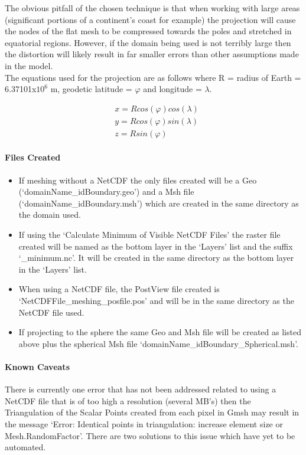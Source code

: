 The obvious pitfall of the chosen technique is that when working with large areas (significant portions of a continent's coast for example) the projection will cause the nodes of the flat mesh to be compressed towards the poles and stretched in equatorial regions. However, if the domain being used is not terribly large then the distortion will likely result in far smaller errors than other assumptions made in the model. \\

The equations used for the projection are as follows where R = radius of Earth = 6.37101x$10^{6}$ m, geodetic latitude = $\varphi$ and longitude = $\lambda$.

\begin{align*}
	&x = Rcos(\varphi)cos(\lambda) \\
	&y = Rcos(\varphi)sin(\lambda) \\
	&z = Rsin(\varphi)
\end{align*}

\paragraph{Files Created}
\begin{itemize}
	\item If meshing without a NetCDF the only files created will be a Geo (`domainName\_idBoundary.geo') and a Msh file (`domainName\_idBoundary.msh') which are created in the same directory as the domain used.
	\item If using the `Calculate Minimum of Visible NetCDF Files' the raster file created will be named as the bottom layer in the `Layers' list and the suffix `\_minimum.nc'. It will be created in the same directory as the bottom layer in the `Layers' list.
	\item When using a NetCDF file, the PostView file created is `NetCDFFile\_meshing\_posfile.pos' and will be in the same directory as the NetCDF file used.
	\item If projecting to the sphere the same Geo and Msh file will be created as listed above plus the spherical Msh file `domainName\_idBoundary\_Spherical.msh'.
\end{itemize}

\paragraph{Known Caveats \\}
There is currently one error that has not been addressed related to using a NetCDF file that is of too high a resolution (several MB's) then the Triangulation of the Scalar Points created from each pixel in Gmsh may result in the message `Error: Identical points in triangulation: increase element size or Mesh.RandomFactor'. There are two solutions to this issue which have yet to be automated. \\

